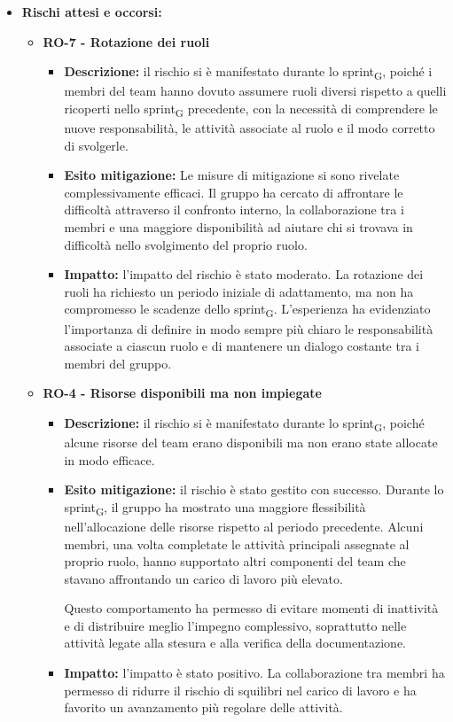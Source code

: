\documentclass[a4paper, 10pt, colorlinks=true, linkcolor=black, urlcolor=blue, citecolor=blue, hidelinks]{article}
\begin{document}
\begin{itemize}
    \item \textbf{Rischi attesi e occorsi:}

    \begin{itemize}
        \item \textbf{RO-7 - Rotazione dei ruoli}
        \begin{itemize}
            \item \textbf{Descrizione:} il rischio si è manifestato durante lo sprint\textsubscript{G}, poiché i membri del team hanno dovuto assumere ruoli diversi rispetto a quelli ricoperti nello sprint\textsubscript{G} precedente, con la necessità di comprendere le nuove responsabilità, le attività associate al ruolo e il modo corretto di svolgerle.

            \item \textbf{Esito mitigazione:} Le misure di mitigazione si sono rivelate complessivamente efficaci. Il gruppo ha cercato di affrontare le difficoltà attraverso il confronto interno, la collaborazione tra i membri e una maggiore disponibilità ad aiutare chi si trovava in difficoltà nello svolgimento del proprio ruolo.

            \item \textbf{Impatto:} l'impatto del rischio è stato moderato. La rotazione dei ruoli ha richiesto un periodo iniziale di adattamento, ma non ha compromesso le scadenze dello sprint\textsubscript{G}. L'esperienza ha evidenziato l'importanza di definire in modo sempre più chiaro le responsabilità associate a ciascun ruolo e di mantenere un dialogo costante tra i membri del gruppo.
        \end{itemize}
        \item \textbf{RO-4 - Risorse disponibili ma non impiegate}
        \begin{itemize}
            \item \textbf{Descrizione:} il rischio si è manifestato durante lo sprint\textsubscript{G}, poiché alcune risorse del team erano disponibili ma non erano state allocate in modo efficace. 
            \item \textbf{Esito mitigazione:} il rischio è stato gestito con successo. Durante lo sprint\textsubscript{G}, il gruppo ha mostrato una maggiore flessibilità nell'allocazione delle risorse rispetto al periodo precedente. Alcuni membri, una volta completate le attività principali assegnate al proprio ruolo, hanno supportato altri componenti del team che stavano affrontando un carico di lavoro più elevato.

            Questo comportamento ha permesso di evitare momenti di inattività e di distribuire meglio l'impegno complessivo, soprattutto nelle attività legate alla stesura e alla verifica della documentazione.

            \item \textbf{Impatto:} l'impatto è stato positivo. La collaborazione tra membri ha permesso di ridurre il rischio di squilibri nel carico di lavoro e ha favorito un avanzamento più regolare delle attività.
        \end{itemize}
    \end{itemize}
\end{itemize}
\end{document}
